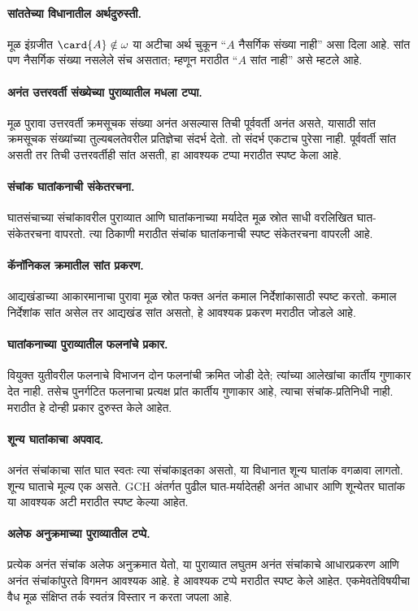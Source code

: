 \paragraph{सांततेच्या विधानातील अर्थदुरुस्ती.} मूळ इंग्रजीत $\card{A}\notin\omega$ या अटीचा अर्थ चुकून “$A$ नैसर्गिक संख्या नाही” असा दिला आहे. सांत पण नैसर्गिक संख्या नसलेले संच असतात; म्हणून मराठीत “$A$ सांत नाही” असे म्हटले आहे.
\paragraph{अनंत उत्तरवर्ती संख्येच्या पुराव्यातील मधला टप्पा.} मूळ पुरावा उत्तरवर्ती क्रमसूचक संख्या अनंत असल्यास तिची पूर्ववर्ती अनंत असते, यासाठी सांत क्रमसूचक संख्यांच्या तुल्यबलतेवरील प्रतिज्ञेचा संदर्भ देतो. तो संदर्भ एकटाच पुरेसा नाही. पूर्ववर्ती सांत असती तर तिची उत्तरवर्तीही सांत असती, हा आवश्यक टप्पा मराठीत स्पष्ट केला आहे.

\paragraph{संचांक घातांकनाची संकेतरचना.} घातसंचाच्या संचांकावरील पुराव्यात आणि घातांकनाच्या मर्यादेत मूळ स्रोत साधी वरलिखित घात-संकेतरचना वापरतो. त्या ठिकाणी मराठीत संचांक घातांकनाची स्पष्ट संकेतरचना वापरली आहे.
\paragraph{कॅनॉनिकल क्रमातील सांत प्रकरण.} आद्यखंडाच्या आकारमानाचा पुरावा मूळ स्रोत फक्त अनंत कमाल निर्देशांकासाठी स्पष्ट करतो. कमाल निर्देशांक सांत असेल तर आद्यखंड सांत असतो, हे आवश्यक प्रकरण मराठीत जोडले आहे.
\paragraph{घातांकनाच्या पुराव्यातील फलनांचे प्रकार.} वियुक्त युतीवरील फलनाचे विभाजन दोन फलनांची क्रमित जोडी देते; त्यांच्या आलेखांचा कार्तीय गुणाकार देत नाही. तसेच पुनर्गटित फलनाचा प्रत्यक्ष प्रांत कार्तीय गुणाकार आहे, त्याचा संचांक-प्रतिनिधी नाही. मराठीत हे दोन्ही प्रकार दुरुस्त केले आहेत.
\paragraph{शून्य घातांकाचा अपवाद.} अनंत संचांकाचा सांत घात स्वतः त्या संचांकाइतका असतो, या विधानात शून्य घातांक वगळावा लागतो. शून्य घाताचे मूल्य एक असते. GCH अंतर्गत पुढील घात-मर्यादेतही अनंत आधार आणि शून्येतर घातांक या आवश्यक अटी मराठीत स्पष्ट केल्या आहेत.
\paragraph{अलेफ अनुक्रमाच्या पुराव्यातील टप्पे.} प्रत्येक अनंत संचांक अलेफ अनुक्रमात येतो, या पुराव्यात लघुतम अनंत संचांकाचे आधारप्रकरण आणि अनंत संचांकांपुरते विगमन आवश्यक आहे. हे आवश्यक टप्पे मराठीत स्पष्ट केले आहेत. एकमेवतेविषयीचा वैध मूळ संक्षिप्त तर्क स्वतंत्र विस्तार न करता जपला आहे.
